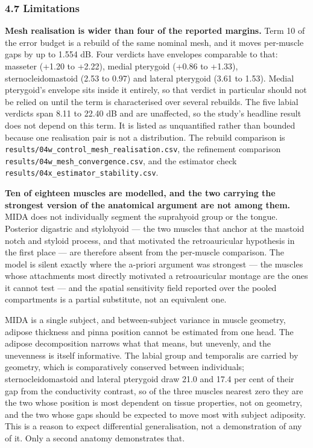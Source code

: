 \documentclass[
  11pt,
  letterpaper,
]{article}
\begin{document}
\subsubsection{4.7 Limitations}\label{limitations}

\textbf{Mesh realisation is wider than four of the reported margins.} Term 10 of the
error budget is a rebuild of the same nominal mesh, and it moves per-muscle gaps
by up to 1.554 dB. Four verdicts have envelopes comparable to that: masseter
(+1.20 to +2.22), medial pterygoid (+0.86 to +1.33), sternocleidomastoid (\textminus{}2.53
to \textminus{}0.97) and lateral pterygoid (\textminus{}3.61 to \textminus{}1.53). Medial pterygoid's envelope
sits inside it entirely, so that verdict in particular should not be relied on
until the term is characterised over several rebuilds. The five labial verdicts
span 8.11 to 22.40 dB and are unaffected, so the study's headline result does
not depend on this term. It is listed as unquantified rather than bounded
because one realisation pair is not a distribution. The rebuild comparison is
\texttt{results/04w\_control\_mesh\_realisation.csv}, the refinement comparison
\texttt{results/04w\_mesh\_convergence.csv}, and the estimator check
\texttt{results/04x\_estimator\_stability.csv}.

\textbf{Ten of eighteen muscles are modelled, and the two carrying the strongest
version of the anatomical argument are not among them.} MIDA does not
individually segment the suprahyoid group or the tongue. Posterior digastric and
stylohyoid --- the two muscles that anchor at the mastoid notch and styloid
process, and that motivated the retroauricular hypothesis in the first place ---
are therefore absent from the per-muscle comparison. The model is silent exactly
where the a-priori argument was strongest --- the muscles whose attachments most
directly motivated a retroauricular montage are the ones it cannot test --- and
the spatial sensitivity field reported over the pooled compartments is a partial
substitute, not an equivalent one.

MIDA is a single subject, and between-subject variance in muscle geometry,
adipose thickness and pinna position cannot be estimated from one head. The
adipose decomposition narrows what that means, but unevenly, and the unevenness
is itself informative. The labial group and temporalis are carried by geometry,
which is comparatively conserved between individuals; sternocleidomastoid and
lateral pterygoid draw 21.0 and 17.4 per cent of their gap from the conductivity
contrast, so of the three muscles nearest zero they are the two whose position
is most dependent on tissue properties, not on geometry, and the two whose gaps
should be expected to move most with subject adiposity. This is a reason to
expect differential generalisation, not a demonstration of any of it. Only a
second anatomy demonstrates that.
\end{document}
